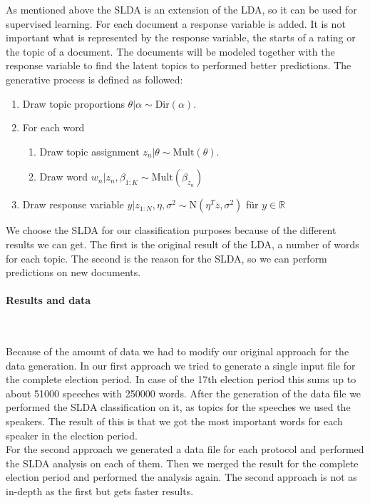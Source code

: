 \documentclass[12pt,paper=a4,nenglish]{scrreprt}
\begin{document}
As mentioned above the SLDA is an extension of the LDA, so it can be used for
supervised learning.
For each document a response variable is added. 
It is not important what is represented by the response variable, the starts of
a rating or the topic of a document.
The documents will be modeled together with the response variable to find the
latent topics to performed better predictions.
The generative process is defined as followed:

\begin{enumerate}
\item Draw topic proportions $ \theta | \alpha \sim \text{Dir}(\alpha) $.
\item For each word
\begin{enumerate}
\item Draw topic assignment $ z_n | \theta \sim \text{Mult}(\theta) $.
\item Draw word $ w_n | z_n, \beta_{1:K} \sim \text{Mult}(\beta_{z_n}) $
\end{enumerate}
\item Draw response variable $ y | z_{1:N}, \eta, \sigma^2 \sim \text{N}(\eta^T\overline{z}, \sigma^2) $ für $ y \in \mathbb{R} $
\end{enumerate}

We choose the SLDA for our classification purposes because of the different results we can get. 
The first is the original result of the LDA, a number of words for each topic. 
The second is the reason for the SLDA, so we can perform predictions on new documents.

\paragraph{Results and data} \hfill \\ \hfill

Because of the amount of data we had to modify our original approach for the data generation. 
In our first approach we tried to generate a single input file for the complete election period. 
In case of the 17th election period this sums up to about 51000 speeches with 250000 words. 
After the generation of the data file we performed the SLDA classification on it, as topics for the speeches we used the speakers. 
The result of this is that we got the most important words for each speaker
in the election period.\\

For the second approach we generated a data file for each protocol and performed the SLDA analysis on each of them. 
Then we merged the result for the complete election period and performed the
analysis again.
The second approach is not as in-depth as the first but gets faster results.
\end{document}
